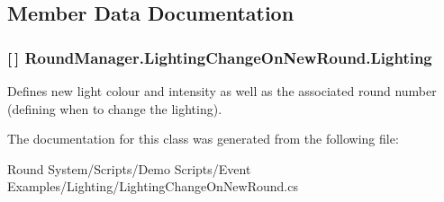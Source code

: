 \subsection{Member Data Documentation}
\hypertarget{class_round_manager_1_1_lighting_change_on_new_round_a4c9fddccdd538fdbc361e4843a236282}{}
\subsubsection[{Lighting}]{ \mbox{[}$\,$\mbox{]} Round\+Manager.\+Lighting\+Change\+On\+New\+Round.\+Lighting}\label{class_round_manager_1_1_lighting_change_on_new_round_a4c9fddccdd538fdbc361e4843a236282}


Defines new light colour and intensity as well as the associated round number (defining when to change the lighting). 



The documentation for this class was generated from the following file\+:\begin{DoxyCompactItemize}
\item 
Round System/\+Scripts/\+Demo Scripts/\+Event Examples/\+Lighting/Lighting\+Change\+On\+New\+Round.\+cs\end{DoxyCompactItemize}
